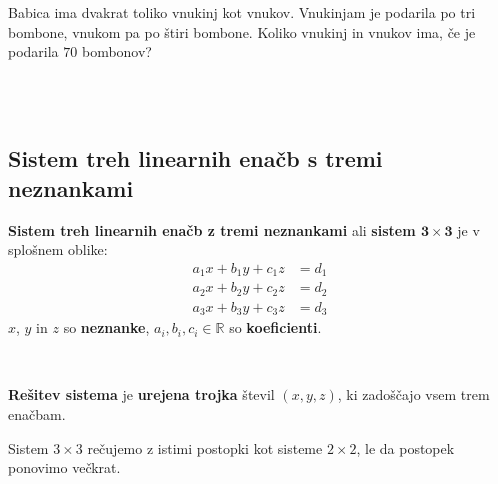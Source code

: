             \begin{naloga}
                Babica ima dvakrat toliko vnukinj kot vnukov. Vnukinjam je podarila po tri bombone, vnukom pa po štiri bombone.
                Koliko vnukinj in vnukov ima, če je podarila $70$ bombonov?
                
            \end{naloga}

        


~~\\~~
      
            
            \subsection{Sistem treh linearnih enačb s tremi neznankami}

                \textbf{Sistem treh linearnih enačb z tremi neznankami} ali \textbf{sistem $\mathbf{3\times 3}$} je v splošnem oblike:
                    $$\begin{aligned}
                            a_1x+b_1y+c_1z&=d_1 \\ a_2x+b_2y+c_2z&=d_2 \\ a_3x+b_3y+c_3z&=d_3
                        \end{aligned}$$
                $x$, $y$ in $z$ so \textbf{neznanke}, $a_i,b_i,c_i\in\mathbb{R}$ so \textbf{koeficienti}.
            
~
            
                \textbf{Rešitev sistema} je \textbf{urejena trojka} števil $(x,y,z)$, ki zadoščajo vsem trem enačbam.
            

            
                    Sistem $3\times 3$ rečujemo z istimi postopki kot sisteme $2\times 2$, le da postopek ponovimo večkrat.
            

        
~~\\~~


